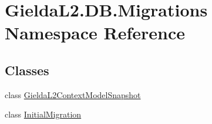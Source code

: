 \hypertarget{namespace_gielda_l2_1_1_d_b_1_1_migrations}{}\section{Gielda\+L2.\+D\+B.\+Migrations Namespace Reference}
\label{namespace_gielda_l2_1_1_d_b_1_1_migrations}
\subsection*{Classes}
\begin{DoxyCompactItemize}
\item 
class \mbox{\hyperlink{class_gielda_l2_1_1_d_b_1_1_migrations_1_1_gielda_l2_context_model_snapshot}{Gielda\+L2\+Context\+Model\+Snapshot}}
\item 
class \mbox{\hyperlink{class_gielda_l2_1_1_d_b_1_1_migrations_1_1_initial_migration}{Initial\+Migration}}
\end{DoxyCompactItemize}
